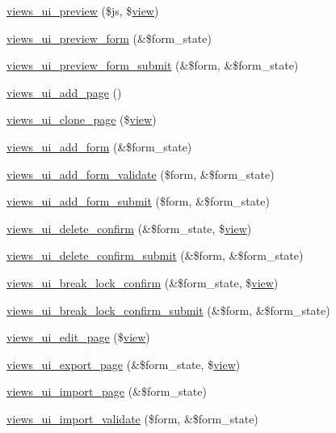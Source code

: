 \begin{CompactItemize}
\item 
\hyperlink{admin_8inc_82e72453c3ff3f251677786b58bb66ec}{views\_\-ui\_\-preview} (\$js, \$\hyperlink{classview}{view})
\item 
\hyperlink{admin_8inc_4fb153a5a54a26dd25b421020cbe538a}{views\_\-ui\_\-preview\_\-form} (\&\$form\_\-state)
\item 
\hyperlink{admin_8inc_ea5410d3cb0285a98e318812447befd3}{views\_\-ui\_\-preview\_\-form\_\-submit} (\&\$form, \&\$form\_\-state)
\item 
\hyperlink{admin_8inc_f5b029abb01c601d29c40a83733a725d}{views\_\-ui\_\-add\_\-page} ()
\item 
\hyperlink{admin_8inc_9578c8af80437c526f0f5e2edce270a2}{views\_\-ui\_\-clone\_\-page} (\$\hyperlink{classview}{view})
\item 
\hyperlink{admin_8inc_f710eec12e4548afda4d0c4345de257e}{views\_\-ui\_\-add\_\-form} (\&\$form\_\-state)
\item 
\hyperlink{admin_8inc_3df2229c5921bd94cf778c96d8630b6a}{views\_\-ui\_\-add\_\-form\_\-validate} (\$form, \&\$form\_\-state)
\item 
\hyperlink{admin_8inc_10536694129577330ac66c50461331c3}{views\_\-ui\_\-add\_\-form\_\-submit} (\$form, \&\$form\_\-state)
\item 
\hyperlink{admin_8inc_6812d24763aef0dcc3bf12fd507ce889}{views\_\-ui\_\-delete\_\-confirm} (\&\$form\_\-state, \$\hyperlink{classview}{view})
\item 
\hyperlink{admin_8inc_5f90c80772fbdba6261594d21157d989}{views\_\-ui\_\-delete\_\-confirm\_\-submit} (\&\$form, \&\$form\_\-state)
\item 
\hyperlink{admin_8inc_d33727efc8afa8203a7e81ce6a4675a6}{views\_\-ui\_\-break\_\-lock\_\-confirm} (\&\$form\_\-state, \$\hyperlink{classview}{view})
\item 
\hyperlink{admin_8inc_c4e4cf7b38cbca3119949d164226ab93}{views\_\-ui\_\-break\_\-lock\_\-confirm\_\-submit} (\&\$form, \&\$form\_\-state)
\item 
\hyperlink{admin_8inc_6a5646e000d998b490692537945f1e80}{views\_\-ui\_\-edit\_\-page} (\$\hyperlink{classview}{view})
\item 
\hyperlink{admin_8inc_24de19609cbac147d353b05d1d0cf54d}{views\_\-ui\_\-export\_\-page} (\&\$form\_\-state, \$\hyperlink{classview}{view})
\item 
\hyperlink{admin_8inc_4cf23cf7b1b9b27fb6a3a93c90447b5f}{views\_\-ui\_\-import\_\-page} (\&\$form\_\-state)
\item 
\hyperlink{admin_8inc_d5771e62497700de3986f6b03a5a3ab6}{views\_\-ui\_\-import\_\-validate} (\$form, \&\$form\_\-state)

\end{CompactItemize}
